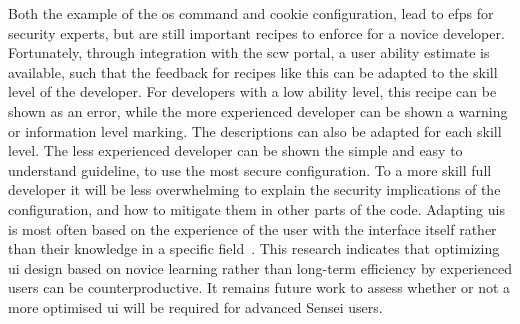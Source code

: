 Both the example of the \gls{os} command and cookie configuration, lead to \glspl{efp} for security experts, but are still important recipes to enforce for a novice developer.
Fortunately, through integration with the \gls{scw} portal, a user ability estimate is available, such that the feedback for recipes like this can be adapted to the skill level of the developer.
For developers with a low ability level, this recipe can be shown as an error, while the more experienced developer can be shown a warning or information level marking.
The descriptions can also be adapted for each skill level.
The less experienced developer can be shown the simple and easy to understand guideline, to use the most secure configuration.
To a more skill full developer it will be less overwhelming to explain the security implications of the configuration, and how to mitigate them in other parts of the code.
Adapting \glspl{ui} is most often based on the experience of the user with the interface itself rather than their knowledge in a specific field~\cite{johnson2015bespoke, cockburn2014supporting}.
This research indicates that optimizing \gls{ui} design based on novice learning rather than long-term efficiency by experienced users can be counterproductive.
It remains future work to assess whether or not a more optimised \gls{ui} will be required for advanced Sensei users.